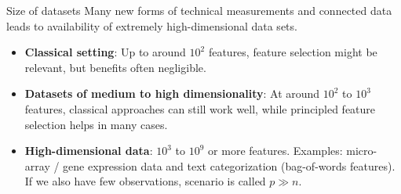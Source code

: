 \documentclass[11pt,compress,t,notes=noshow, xcolor=table]{beamer}
\begin{document}
  \begin{vbframe}{Size of datasets}
Many new forms of technical measurements and connected data leads to availability of extremely high-dimensional data sets.

\vspace{0.5cm}
    \begin{itemize}
    \setlength{\itemsep}{1.2em}
      \item \textbf{Classical setting}: Up to around $10^2$ features, feature selection might be relevant, but benefits often negligible.
      \item \textbf{Datasets of medium to high dimensionality}:
        At around $10^2$ to $10^3$ features, classical approaches can still work well, while principled feature selection helps in many cases.
      \item \textbf{High-dimensional data}: $10^3$ to $10^9$ or more features.
        Examples: micro-array / gene expression data and text categorization (bag-of-words features).
        If we also have few observations, scenario is called $p \gg n$.
    \end{itemize}

  \end{vbframe}
\end{document}
